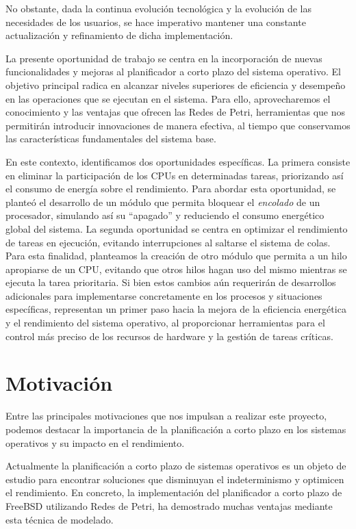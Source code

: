 No obstante, dada la continua evolución tecnológica y la evolución de las necesidades de los usuarios, se hace imperativo mantener una constante actualización y refinamiento de dicha implementación.\par

La presente oportunidad de trabajo se centra en la incorporación de nuevas funcionalidades y mejoras al planificador a corto plazo del sistema operativo. El objetivo principal radica en alcanzar niveles superiores de eficiencia y desempeño en las operaciones que se ejecutan en el sistema. Para ello, aprovecharemos el conocimiento y las ventajas que ofrecen las Redes de Petri, herramientas que nos permitirán introducir innovaciones de manera efectiva, al tiempo que conservamos las características fundamentales del sistema base.\par

En este contexto, identificamos dos oportunidades específicas. La primera consiste en eliminar la participación de los CPUs en determinadas tareas, priorizando así el consumo de energía sobre el rendimiento. Para abordar esta oportunidad, se planteó el desarrollo de un módulo que permita bloquear el \textit{encolado} de un procesador, simulando así su ``apagado'' y reduciendo el consumo energético global del sistema. La segunda oportunidad se centra en optimizar el rendimiento de tareas en ejecución, evitando interrupciones al saltarse el sistema de colas. Para esta finalidad, planteamos la creación de otro módulo que permita a un hilo apropiarse de un CPU, evitando que otros hilos hagan uso del mismo mientras se ejecuta la tarea prioritaria. Si bien estos cambios aún requerirán de desarrollos adicionales para implementarse concretamente en los procesos y situaciones específicas, representan un primer paso hacia la mejora de la eficiencia energética y el rendimiento del sistema operativo, al proporcionar herramientas para el control más preciso de los recursos de hardware y la gestión de tareas críticas.\par

\section{Motivación}
Entre las principales motivaciones que nos impulsan a realizar este proyecto, podemos destacar la importancia de la planificación a corto plazo en los sistemas operativos y su impacto en el rendimiento.

Actualmente la planificación a corto plazo de sistemas operativos es un objeto de estudio para encontrar soluciones que disminuyan el indeterminismo y optimicen el rendimiento. En concreto, la implementación del planificador a corto plazo de FreeBSD utilizando Redes de Petri, ha demostrado muchas ventajas mediante esta técnica de modelado.\par


